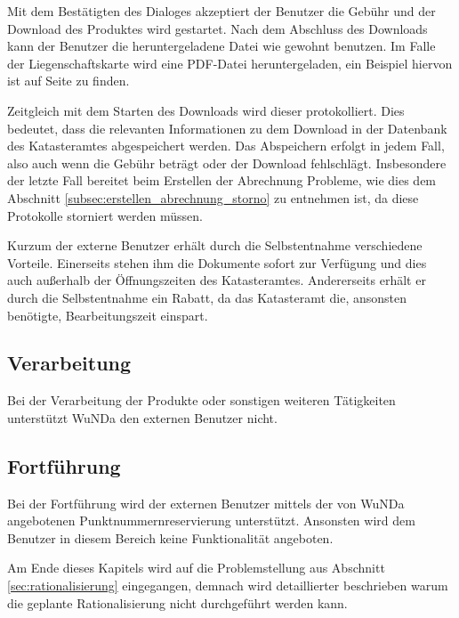 Mit dem Bestätigten des Dialoges akzeptiert der Benutzer die Gebühr und der Download des Produktes wird gestartet. Nach dem Abschluss des Downloads kann der Benutzer die heruntergeladene Datei wie gewohnt benutzen. Im Falle der Liegenschaftskarte wird eine PDF-Datei heruntergeladen, ein Beispiel hiervon ist auf Seite \pageref{fig:flurkarte} zu finden.

\label{subsec:beschaffung-download}
Zeitgleich mit dem Starten des Downloads wird dieser protokolliert. Dies bedeutet, dass die relevanten Informationen zu dem Download in der Datenbank des Katasteramtes abgespeichert werden. Das Abspeichern erfolgt in jedem Fall, also auch wenn die Gebühr  beträgt oder der Download fehlschlägt. Insbesondere der letzte Fall bereitet beim Erstellen der Abrechnung Probleme, wie dies dem Abschnitt \ref{subsec:erstellen_abrechnung_storno} zu entnehmen ist, da diese Protokolle storniert werden müssen.
 
Kurzum der externe Benutzer erhält durch die Selbstentnahme verschiedene Vorteile.
Einerseits stehen ihm die Dokumente sofort zur Verfügung und dies auch außerhalb der Öffnungszeiten des Katasteramtes.
Andererseits erhält er durch die Selbstentnahme ein Rabatt, da das Katasteramt die, ansonsten benötigte, Bearbeitungszeit einspart.

\subsection{Verarbeitung}
Bei der Verarbeitung der Produkte oder sonstigen weiteren Tätigkeiten unterstützt \ac{WuNDa} den externen Benutzer nicht.

\subsection{Fortführung}
Bei der Fortführung wird der externen Benutzer mittels der von \ac{WuNDa} angebotenen Punktnummernreservierung unterstützt.
Ansonsten wird dem Benutzer in diesem Bereich keine Funktionalität angeboten.

\bigskip
Am Ende dieses Kapitels wird auf die Problemstellung aus Abschnitt \ref{sec:rationalisierung} eingegangen, demnach wird detaillierter beschrieben warum die geplante Rationalisierung nicht durchgeführt werden kann.


